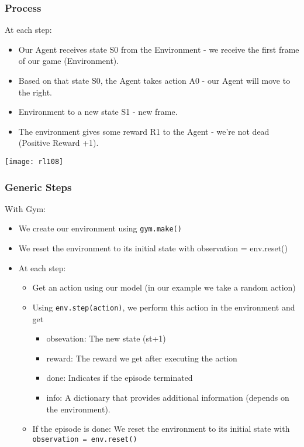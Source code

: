 \begin{frame}[fragile]\frametitle{Process}

At each step:

\begin{itemize}
\item Our Agent receives state S0 from the Environment - we receive the first frame of our game (Environment).
\item Based on that state S0, the Agent takes action A0 - our Agent will move to the right.
\item Environment to a new state S1 - new frame.
\item The environment gives some reward R1 to the Agent - we're not dead (Positive Reward +1).
\end{itemize}

\begin{center}
\texttt{[image: rl108]}
\end{center}

\end{frame}

\begin{frame}[fragile]\frametitle{Generic Steps}

With Gym:

\begin{itemize}
\item We create our environment using \lstinline|gym.make()|
\item We reset the environment to its initial state with observation = env.reset()
\item At each step:

	\begin{itemize}
	\item Get an action using our model (in our example we take a random action)
	\item Using \lstinline|env.step(action)|, we perform this action in the environment and get

		\begin{itemize}
		\item obsevation: The new state (st+1)
		\item reward: The reward we get after executing the action
		\item done: Indicates if the episode terminated
		\item info: A dictionary that provides additional information (depends on the environment).
		\end{itemize}

	\item If the episode is done: We reset the environment to its initial state with \lstinline|observation = env.reset()|
	\end{itemize}
\end{itemize}

\end{frame}

